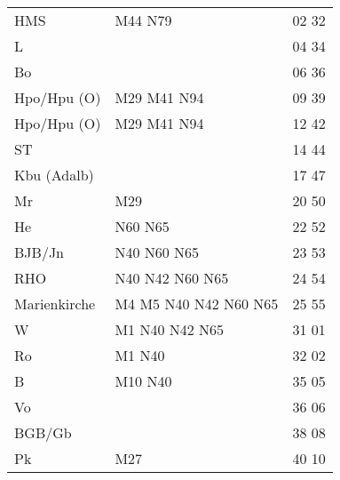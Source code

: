 \begin{tabular}{!{\color{schiefergrau}\vrule width 3pt}*{3}{l!{\color{schiefergrau}\vrule width 3pt}}}
\hline
{}
 \\
\hline
HMS          & \mbus{} M44 \nbus{} N79                                        & 02 32 \\
L            &                                                                & 04 34 \\
Bo           &                                                                & 06 36 \\
Hpo/Hpu (O)  & \nusieben{} \mbus{} M29 M41 \nbus{} N94                        & 09 39 \\
\hline
Hpo/Hpu (O)  & \nusieben{} \mbus{} M29 M41 \nbus{} N94                        & 12 42 \\
ST           &                                                                & 14 44 \\
Kbu (Adalb)  & \nueins{}                                                      & 17 47 \\
Mr           & \mbus{} M29                                                    & 20 50 \\
He           & \nbus{} N60 N65                                                & 22 52 \\
BJB/Jn       & \nbus{} N40 N60 N65                                            & 23 53 \\
RHO          & \nuzwei{} \nbus{} N40 N42 N60 N65                              & 24 54 \\
Marienkirche & \nuzwei{} \nufuenf{} \mtram{} M4 M5 \nbus{} N40 N42 N60 N65    & 25 55 \\
W            & \nuzwei{} \nufuenf{} \mtram{} M1 \nbus{} N40 N42 N65           & 31 01 \\
Ro           & \mtram{} M1 \nbus{} N40                                        & 32 02 \\
B            & \mtram{} M10 \nbus{} N40                                       & 35 05 \\
Vo           &                                                                & 36 06 \\
BGB/Gb       &                                                                & 38 08 \\
Pk           & \mbus{} M27                                                    & 40 10 \\

\end{tabular}
